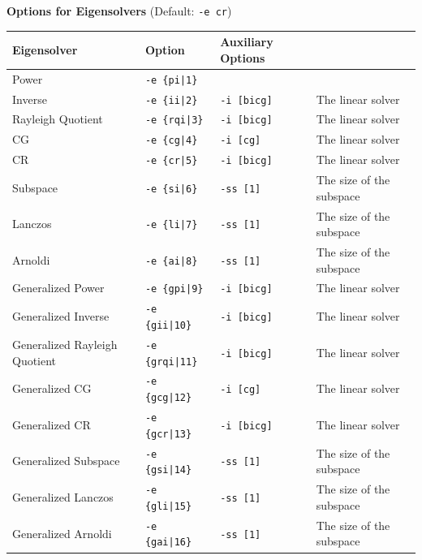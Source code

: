 \documentclass[a4paper]{article}
\begin{document}
\begin{minipage}[t]{\textwidth}
\begin{center}
{\bf Options for Eigensolvers} (Default: \verb=-e cr=) \\
\begin{tabular}{l|lll}\hline\hline
 Eigensolver      & Option              &  Auxiliary Options  & \\ \hline
\hline
 Power                             & \verb=-e {pi|1}=        &    \\ 
 Inverse                           & \verb=-e {ii|2}=        &
 \verb=-i [bicg]= & The linear solver \\
 Rayleigh Quotient                 & \verb=-e {rqi|3}=       &
 \verb=-i [bicg]= & The linear solver \\
 CG                                & \verb=-e {cg|4}=        &
 \verb=-i [cg]= & The linear solver \\ 
 CR                                & \verb=-e {cr|5}=        &
 \verb=-i [bicg]= & The linear solver \\ 
 Subspace                          & \verb=-e {si|6}=        &
 \verb=-ss [1]= & The size of the subspace \\
 Lanczos                           & \verb=-e {li|7}=        &
 \verb=-ss [1]= & The size of the subspace \\
 Arnoldi                           & \verb=-e {ai|8}=        &
 \verb=-ss [1]= & The size of the subspace \\
 Generalized Power                 & \verb=-e {gpi|9}=      &
 \verb=-i [bicg]= & The linear solver \\ 
 Generalized Inverse               & \verb=-e {gii|10}=      & 
 \verb=-i [bicg]= & The linear solver \\
 Generalized Rayleigh Quotient     & \verb=-e {grqi|11}=      & 
 \verb=-i [bicg]= & The linear solver \\ 
 Generalized CG                    & \verb=-e {gcg|12}=      & 
 \verb=-i [cg]= & The linear solver \\
 Generalized CR                    & \verb=-e {gcr|13}=      & 
 \verb=-i [bicg]= & The linear solver \\
 Generalized Subspace              & \verb=-e {gsi|14}=      &
 \verb=-ss [1]= & The size of the subspace \\
 Generalized Lanczos               & \verb=-e {gli|15}=      &
 \verb=-ss [1]= & The size of the subspace \\
 Generalized Arnoldi               & \verb=-e {gai|16}=      &
 \verb=-ss [1]= & The size of the subspace \\  


\end{tabular}
\end{center}
\end{minipage}
\end{document}
